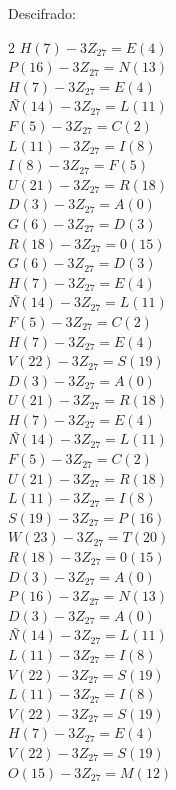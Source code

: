 \documentclass{article}
\begin{document}
\begin{enumerate}
  
 Descifrado:
     \begin{multicols}{2} 
 $H(7)-3 Z_{27}= E (4)$\\
 $P(16)-3 Z_{27}=N (13)$\\
 $H(7)-3 Z_{27}= E (4)$\\
 \textit{Ñ}$ (14)-3 Z_{27}= L (11)$\\
 $F(5)-3 Z_{27}= C (2)$\\
 $L(11)-3 Z_{27}=I (8)$\\
 $I(8)-3 Z_{27}=F (5)$\\
 $U(21)-3 Z_{27}=R (18)$\\
 $D(3)-3 Z_{27}=A (0)$\\
 $G(6)-3 Z_{27}=D (3)$\\
 $R(18)-3 Z_{27}=0 (15)$\\
 $G(6)-3 Z_{27}=D (3)$\\
 $H(7)-3 Z_{27}= E (4)$\\
 \textit{Ñ}$ (14)-3 Z_{27}= L (11)$\\
 $F(5)-3 Z_{27}=C (2)$\\
 $H(7)-3 Z_{27}= E (4)$\\
 $V(22)-3 Z_{27}=S (19)$\\
 $D(3)-3 Z_{27}=A (0)$\\
 $U(21)-3 Z_{27}=R (18)$\\
 $H(7)-3 Z_{27}= E (4)$\\
 \textit{Ñ}$ (14)-3 Z_{27}= L (11)$\\
 $F(5)-3 Z_{27}=C (2)$\\
 $U(21)-3 Z_{27}=R (18)$\\
 $L(11)-3 Z_{27}=I (8)$\\
 $S(19)-3 Z_{27}=P (16)$\\
 $W(23)-3 Z_{27}=T (20)$\\
 $R(18)-3 Z_{27}=0 (15)$\\
 $D(3)-3 Z_{27}=A (0)$\\
 $P(16)-3 Z_{27}=N (13)$\\ 
 $D(3)-3 Z_{27}=A (0)$\\
 \textit{Ñ}$(14)-3 Z_{27}= L (11)$\\
 $L(11)-3 Z_{27}=I (8)$\\ 
 $V(22)-3 Z_{27}=S (19)$\\
 $L(11)-3 Z_{27}=I (8)$\\ 
 $V(22)-3 Z_{27}=S (19)$\\
 $H(7)-3 Z_{27}= E (4)$\\
 $V(22)-3 Z_{27}=S (19)$\\
 $O(15)-3 Z_{27}=M (12)$\\

\end{multicols}
\end{enumerate}
\end{document}
